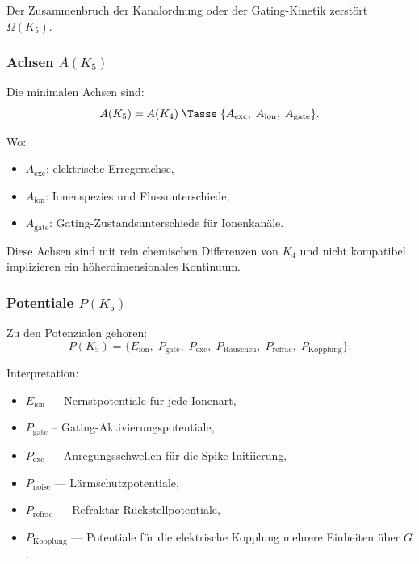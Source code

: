 Der Zusammenbruch der Kanalordnung oder der Gating-Kinetik zerstört $\Omega(K_5)$.

\subsubsection{Achsen \texorpdfstring{$A(K_5)$}{A(K_5)}}

Die minimalen Achsen sind:
\[
A(K_5) = A(K_4)\; \Tasse\;
\{ A_{\mathrm{exc}},\; A_{\mathrm{ion}},\; A_{\mathrm{gate}} \}.
\]

Wo:
\begin{itemize}
    \item $A_{\mathrm{exc}}$: elektrische Erregerachse,
    \item $A_{\mathrm{ion}}$: Ionenspezies und Flussunterschiede,
    \item $A_{\mathrm{gate}}$: Gating-Zustandsunterschiede für Ionenkanäle.
\end{itemize}

Diese Achsen sind mit rein chemischen Differenzen von $K_4$ und nicht kompatibel
implizieren ein höherdimensionales Kontinuum.

\subsubsection{Potentiale \texorpdfstring{$P(K_5)$}{P(K_5)}}

Zu den Potenzialen gehören:
\[
P(K_5)=\{
E_{\mathrm{ion}},\;
P_{\mathrm{gate}},\;
P_{\mathrm{exc}},\;
P_{\mathrm{Rauschen}},\;
P_{\mathrm{refrac}},\;
P_{\mathrm{Kopplung}}
\}.
\]

Interpretation:
\begin{itemize}
    \item $E_{\mathrm{ion}}$ — Nernstpotentiale für jede Ionenart,
    \item $P_{\mathrm{gate}}$ – Gating-Aktivierungspotentiale,
    \item $P_{\mathrm{exc}}$ — Anregungsschwellen für die Spike-Initiierung,
    \item $P_{\mathrm{noise}}$ — Lärmschutzpotentiale,
    \item $P_{\mathrm{refrac}}$ — Refraktär-Rückstellpotentiale,
    \item $P_{\mathrm{Kopplung}}$ — Potentiale für die elektrische Kopplung
          mehrere Einheiten über $G$.
\end{itemize}

